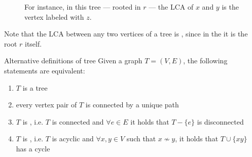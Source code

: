 \documentclass[a4paper, 12pt]{report}
\begin{document}
    \begin{figure}[H]
        \centering
        \caption{For instance, in this tree --- rooted in $r$ --- the LCA of $x$ and $y$ is the vertex labeled with $z$.}
    \end{figure}

    Note that the LCA between any two vertices of a tree is , since in the  it is the root $r$ itself.

    \begin{framedthm}[label={tree alt}]{Alternative definitions of tree}
        Given a graph $T = (V, E)$, the following statements are equivalent:

        \begin{enumerate}
            \item $T$ is a tree
            \item every vertex pair of $T$ is connected by a unique path
            \item $T$ is , i.e. $T$ is connected and $\forall e \in E$ it holds that $T- \{e\}$ is disconnected
            \item $T$ is , i.e. $T$ is acyclic and $\forall x, y \in V$ such that $x \nsim y$, it holds that $T \cup \{xy\}$ has a cycle
        \end{enumerate}
    \end{framedthm}
\end{document}
